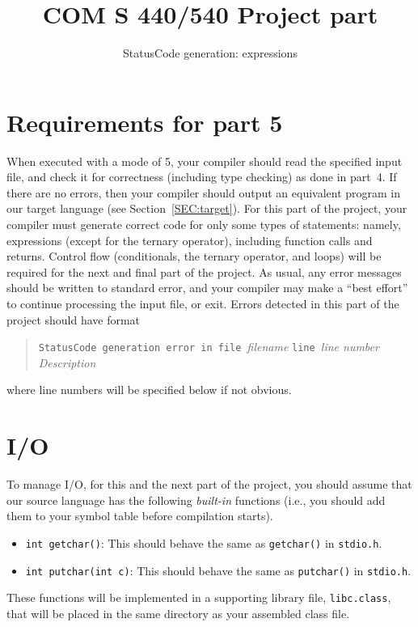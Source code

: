\documentclass{article}
\title{COM S 440/540 Project part \codegen}
\author{StatusCode generation: expressions}
\date{}
\newcommand{\typecheck}{4}
\newcommand{\codegen}{5}
\begin{document}
\maketitle

\section{Requirements for part \codegen}

When executed with a mode of \codegen,
your compiler should read the specified input file,
and check it for correctness (including type checking) as done in part~\typecheck.
If there are no errors, then your compiler should output
an equivalent program in our target language
(see Section~\ref{SEC:target}).
For this part of the project,
your compiler must generate correct code for only some types of
statements:
namely, expressions (except for the ternary operator),
including function calls and returns.
Control flow (conditionals, the ternary operator, and loops)
will be required for the next and final part of the project.
As usual,
any error messages should be written to standard error,
and your compiler may make a ``best effort'' to continue processing
the input file, or exit.
Errors detected in this part of the project should have format
\begin{quote}
  \begin{tabbing}
		{\tt StatusCode ge}\={\tt neration error in file }\emph{filename}
		{\tt line }\emph{line number}
	\\
		\> \emph{Description}
  \end{tabbing}
\end{quote}
where line numbers will be specified below if not obvious.




\section{I/O}

To manage I/O,
for this and the next part of the project,
you should assume that our source language has
the following \emph{built-in} functions
(i.e., you should add them to your symbol table before compilation starts).
\begin{itemize}
  \item \lstinline|int getchar()|:
    This should behave the same as {\tt getchar()} in {\tt stdio.h}.

  \item \lstinline|int putchar(int c)|:
    This should behave the same as {\tt putchar()} in {\tt stdio.h}.
\end{itemize}
These functions will be implemented in a supporting library file,
{\tt libc.class}, that will be placed in the same directory
as your assembled class file.
\end{document}
